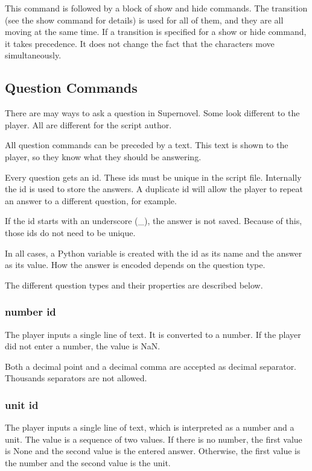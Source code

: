\documentclass{article}
\begin{document}
This command is followed by a block of show and hide commands. The transition
(see the show command for details) is used for all of them, and they are all
moving at the same time. If a transition is specified for a show or hide
command, it takes precedence. It does not change the fact that the characters
move simultaneously.

\subsection{Question Commands}
There are may ways to ask a question in Supernovel. Some look different to the
player. All are different for the script author.

All question commands can be preceded by a text. This text is shown to the
player, so they know what they should be answering.

Every question gets an id. These ids must be unique in the script file.
Internally the id is used to store the answers. A duplicate id will allow the
player to repeat an answer to a different question, for example.

If the id starts with an underscore (\_), the answer is not saved. Because of
this, those ids do not need to be unique.

In all cases, a Python variable is created with the id as its name and the
answer as its value. How the answer is encoded depends on the question type.

The different question types and their properties are described below.

\subsubsection{number id}
The player inputs a single line of text. It is converted to a number. If the
player did not enter a number, the value is NaN.

Both a decimal point and a decimal comma are accepted as decimal separator.
Thousands separators are not allowed.

\subsubsection{unit id}
The player inputs a single line of text, which is interpreted as a number and a
unit. The value is a sequence of two values. If there is no number, the first
value is None and the second value is the entered answer. Otherwise, the first
value is the number and the second value is the unit.
\end{document}
